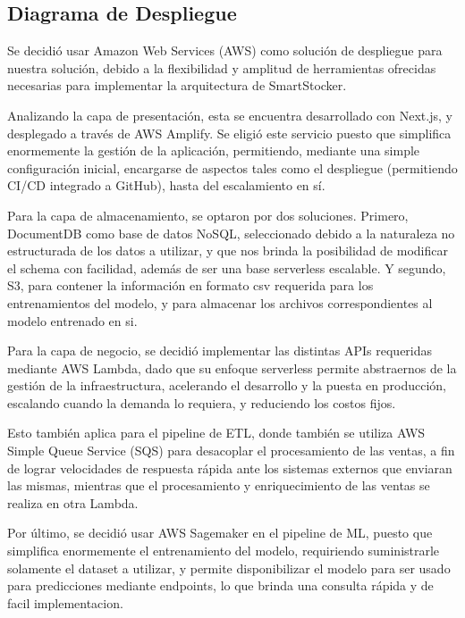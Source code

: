 \subsection{Diagrama de Despliegue}\label{sec:arquitectura-despliegue}
Se decidió usar Amazon Web Services (AWS) como solución de despliegue para nuestra solución, debido a la flexibilidad y amplitud de herramientas ofrecidas necesarias para implementar la arquitectura de SmartStocker.

Analizando la capa de presentación, esta se encuentra desarrollado con Next.js, y desplegado a través de AWS Amplify. Se eligió este servicio puesto que simplifica enormemente la gestión de la aplicación, permitiendo, mediante una simple configuración inicial, encargarse de aspectos tales como el despliegue (permitiendo CI/CD integrado a GitHub), hasta del escalamiento en sí.

Para la capa de almacenamiento, se optaron por dos soluciones. Primero, DocumentDB como base de datos NoSQL, seleccionado debido a la naturaleza no estructurada de los datos a utilizar, y que nos brinda la posibilidad de modificar el schema con facilidad, además de ser una base serverless escalable. Y segundo, S3, para contener la información en formato csv requerida para los entrenamientos del modelo, y para almacenar los archivos correspondientes al modelo entrenado en si.

Para la capa de negocio, se decidió implementar las distintas APIs requeridas mediante AWS Lambda, dado que su enfoque serverless permite abstraernos de la gestión de la infraestructura, acelerando el desarrollo y la puesta en producción, escalando cuando la demanda lo requiera, y reduciendo los costos fijos.

Esto también aplica para el pipeline de ETL, donde también se utiliza AWS Simple Queue Service (SQS) para desacoplar el procesamiento de las ventas, a fin de lograr velocidades de respuesta rápida ante los sistemas externos que enviaran las mismas, mientras que el procesamiento y enriquecimiento de las ventas se realiza en otra Lambda.

Por último, se decidió usar AWS Sagemaker en el pipeline de ML, puesto que simplifica enormemente el entrenamiento del modelo, requiriendo suministrarle solamente el dataset a utilizar, y permite disponibilizar el modelo para ser usado para predicciones mediante endpoints, lo que brinda una consulta rápida y de facil implementacion.

